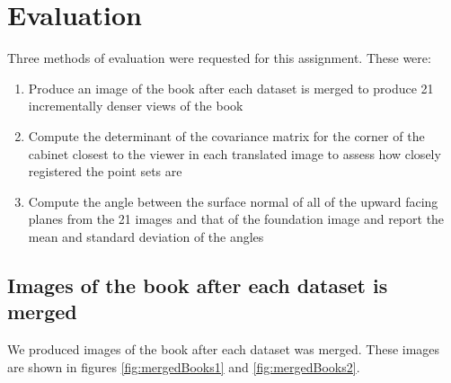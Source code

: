 \section{Evaluation}

Three methods of evaluation were requested for this assignment. These were:

\begin{enumerate}
	\item Produce an image of the book after each dataset is merged to produce 21 incrementally denser views of the book
	\item Compute the determinant of the covariance matrix for the corner of the cabinet closest to the viewer in each translated image to assess how closely registered the point sets are
	\item Compute the angle between the surface normal of all of the upward facing planes from the 21 images and that of the foundation image and report the mean and standard deviation of the angles
\end{enumerate}

\subsection{Images of the book after each dataset is merged}

We produced images of the book after each dataset was merged. These images are shown in figures \ref{fig:mergedBooks1} and \ref{fig:mergedBooks2}.

